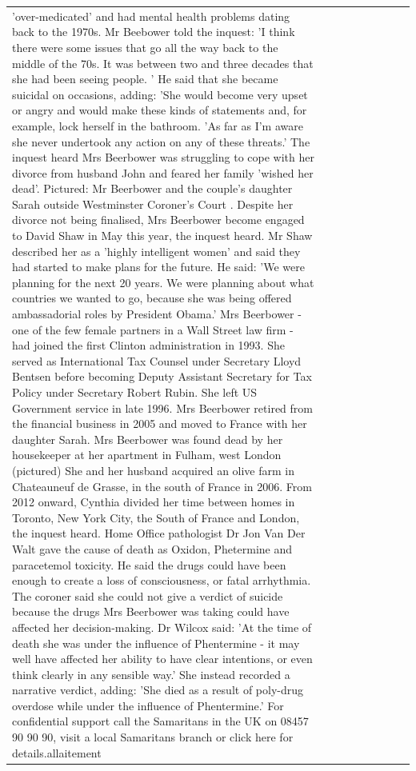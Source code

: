 \begin{table}[H]
\begin{tabular}{lllrlllll}
'over-medicated' and had mental health problems dating back to the 1970s. Mr Beebower told the inquest: 'I think there were some issues that go all the way back to the middle of the 70s. It was between two and three decades that she had been seeing people. ' He said that she became suicidal on occasions, adding: 'She would become very upset or angry and would make these kinds of statements and, for example, lock herself in the bathroom. 'As far as I'm aware she never undertook any action on any of these threats.' The inquest heard Mrs Beerbower was struggling to cope with her divorce from husband John and feared her family 'wished her dead'. Pictured: Mr Beerbower and the couple's daughter Sarah outside Westminster Coroner's Court . Despite her divorce not being finalised, Mrs Beerbower become engaged to David Shaw in May this year, the inquest heard. Mr Shaw described her as a 'highly intelligent women' and said they had started to make plans for the future. He said: 'We were planning for the next 20 years. We were planning about what countries we wanted to go, because she was being offered ambassadorial roles by President Obama.' Mrs Beerbower - one of the few female partners in a Wall Street law firm - had joined the first Clinton administration in 1993. She served as International Tax Counsel under Secretary Lloyd Bentsen before becoming Deputy Assistant Secretary for Tax Policy under Secretary Robert Rubin. She left US Government service in late 1996. Mrs Beerbower retired from the financial business in 2005 and moved to France with her daughter Sarah. Mrs Beerbower was found dead by her housekeeper at her apartment in Fulham, west London (pictured) She and her husband acquired an olive farm in Chateauneuf de Grasse, in the south of France in 2006. From 2012 onward, Cynthia divided her time between homes in Toronto, New York City, the South of France and London, the inquest heard. Home Office pathologist Dr Jon Van Der Walt gave the cause of death as Oxidon, Phetermine and paracetemol toxicity. He said the drugs could have been enough to create a loss of consciousness, or fatal arrhythmia. The coroner said she could not give a verdict of suicide because the drugs Mrs Beerbower was taking could have affected her decision-making. Dr Wilcox said: 'At the time of death she was under the influence of Phentermine - it may well have affected her ability to have clear intentions, or even think clearly in any sensible way.' She instead recorded a narrative verdict, adding: 'She died as a result of poly-drug overdose while under the influence of Phentermine.' For confidential support call the Samaritans in the UK on 08457 90 90 90, visit a local Samaritans branch or click here for details.allaitement \\

\end{tabular}
\end{table}
